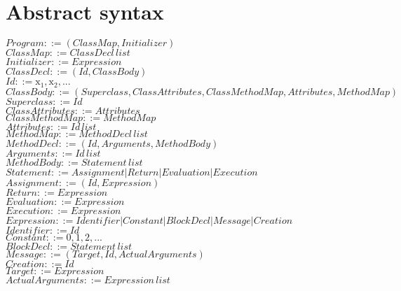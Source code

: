 \documentclass[11pt,a4paper,twoside]{article}
\begin{document}
\section{Abstract syntax}
$\;$\\
$Program ::= (ClassMap, Initializer)$\\
$ClassMap ::= ClassDecl\,list$\\
$Initializer ::= Expression$\\
$ClassDecl ::= (Id, ClassBody)$\\
$Id ::= \mathrm{x_{1}, x_{2}, ...}$\\
$ClassBody ::= (Superclass, ClassAttributes, ClassMethodMap, Attributes, MethodMap)$\\
$Superclass ::= Id$\\
$ClassAttributes ::= Attributes$\\
$ClassMethodMap ::= MethodMap$\\
$Attributes ::= Id\,list$\\
$MethodMap ::= MethodDecl\,list$\\
$MethodDecl ::= (Id, Arguments, MethodBody)$\\
$Arguments ::= Id\,list$\\
$MethodBody ::= Statement\,list$\\
$Statement ::= Assignment | Return | Evaluation | Execution$\\
$Assignment ::= (Id, Expression)$\\
$Return ::= Expression$\\
$Evaluation ::= Expression$\\
$Execution ::= Expression$\\
$Expression ::= Identifier | Constant | BlockDecl | Message | Creation$\\
$Identifier ::= Id$\\
$Constant ::= \mathrm{0, 1, 2, ...}$\\
$BlockDecl ::= Statement\,list$\\
$Message ::= (Target, Id, ActualArguments)$\\
$Creation ::= Id$\\
$Target ::= Expression$\\
$ActualArguments ::= Expression\,list$\\
\end{document}
